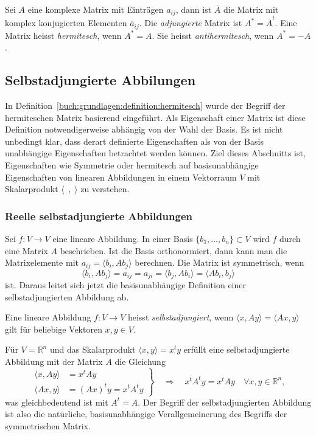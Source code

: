 \begin{definition}
\label{buch:grundlagen:definition:hermitesch}
Sei $A$ eine komplexe Matrix mit Einträgen $a_{i\!j}$, dann ist
$\overline{A}$ die Matrix mit komplex konjugierten Elementen
$\overline{a}_{i\!j}$.
Die {\em adjungierte} Matrix ist $A^*=\overline{A}^t$.
%
Eine Matrix heisst {\em hermitesch}, wenn $A^*=A$.
%
Sie heisst {\em antihermitesch}, wenn $A^*=-A$.
\end{definition}

\subsection{Selbstadjungierte Abbilungen
\label{buch:subsection:selbstadjungiert}}
In Definition~\ref{buch:grundlagen:definition:hermitesch}
wurde der Begriff der hermiteschen Matrix basierend
eingeführt.
Als Eigenschaft einer Matrix ist diese Definition notwendigerweise
abhängig von der Wahl der Basis.
Es ist nicht unbedingt klar, dass derart definierte Eigenschaften
als von der Basis unabhängige Eigenschaften betrachtet werden können.
Ziel dieses Abschnitts ist, Eigenschaften wie Symmetrie oder
hermitesch auf basisunabhängige Eigenschaften von
linearen Abbildungen in einem Vektorraum $V$ mit Skalarprodukt
$\langle\;\,,\;\rangle$ zu verstehen.

\subsubsection{Reelle selbstadjungierte Abbildungen}
Sei $f\colon V\to V$ eine lineare Abbildung.
In einer Basis $\{b_1,\dots,b_n\}\subset V$ wird $f$ durch eine
Matrix $A$ beschrieben.
Ist die Basis orthonormiert, dann kann man die Matrixelemente 
mit $a_{i\!j}=\langle b_i,Ab_j\rangle$ berechnen.
Die Matrix ist symmetrisch, wenn 
\[
\langle b_i,Ab_j\rangle
=
a_{i\!j}
= 
a_{ji}
=
\langle b_j,Ab_i \rangle
=
\langle Ab_i,b_j \rangle
\]
ist.
Daraus leitet sich jetzt die basisunabhängige Definition einer
selbstadjungierten Abbildung ab.

\begin{definition}
Eine lineare Abbildung $f\colon V\to V$ heisst {\em selbstadjungiert}, wenn
$\langle x,Ay\rangle=\langle Ax,y\rangle$ gilt für beliebige 
Vektoren $x,y\in V$.
%
\end{definition}

Für $V=\mathbb{R}^n$ und das Skalarprodukt $\langle x,y\rangle=x^ty$ 
erfüllt eine selbstadjungierte Abbildung mit der Matrix $A$ die Gleichung
\[
\left.
\begin{aligned}
\langle x,Ay\rangle
&=
x^tAy
\\
\langle Ax,y\rangle
&=
(Ax)^ty=x^tA^ty
\end{aligned}
\right\}
\quad\Rightarrow\quad
x^tA^ty = x^tAy\quad\forall x,y\in\mathbb{R}^n,
\]
was gleichbedeutend ist mit $A^t=A$.
Der Begriff der selbstadjungierten Abbildung ist also die natürliche,
basisunabhängige
Verallgemeinerung des Begriffs der symmetrischen Matrix.

